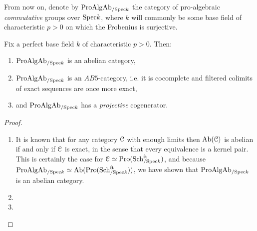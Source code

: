                 \begin{convention}
                    From now on, denote by $\mathrm{Pro}\mathrm{Alg}\mathrm{Ab}_{/\mathrm{Spec} k}$ the category of pro-algebraic \textit{commutative} groups over $\mathrm{Spec} k$, where $k$ will commonly be some base field of characteristic $p > 0$ on which the Frobenius is surjective.
                \end{convention}
                \begin{proposition} \label{prop: the_cogrothendieck_category_of_pro_algebraic_commutative_groups}
                    Fix a perfect base field $k$ of characteristic $p > 0$. Then:
                        \begin{enumerate}
                            \item $\mathrm{Pro}\mathrm{Alg}\mathrm{Ab}_{/\mathrm{Spec} k}$ is an abelian category,
                            \item $\mathrm{Pro}\mathrm{Alg}\mathrm{Ab}_{/\mathrm{Spec} k}$ is an $AB5$-category, i.e. it is cocomplete and filtered colimits of exact sequences are once more exact,
                            \item and $\mathrm{Pro}\mathrm{Alg}\mathrm{Ab}_{/\mathrm{Spec} k}$ has a \textit{projective} cogenerator.
                        \end{enumerate}
                \end{proposition}
                    \begin{proof}
                        \noindent
                        \begin{enumerate}
                            \item It is known that for any category $\mathcal{C}$ with enough limits then $\mathrm{Ab}(\mathcal{C})$ is abelian if and only if $\mathcal{C}$ is exact, in the sense that every equivalence is a kernel pair. This is certainly the case for $\mathcal{C} \simeq \mathrm{Pro}(\mathrm{Sch}^{\mathrm{ft}}_{/\mathrm{Spec} k})$, and because $\mathrm{Pro}\mathrm{Alg}\mathrm{Ab}_{/\mathrm{Spec} k} \simeq \mathrm{Ab}(\mathrm{Pro}(\mathrm{Sch}^{\mathrm{ft}}_{/\mathrm{Spec} k}))$, we have shown that $\mathrm{Pro}\mathrm{Alg}\mathrm{Ab}_{/\mathrm{Spec} k}$ is an abelian category.
                            \item 
                            \item 
                        \end{enumerate}
                    \end{proof}
                
